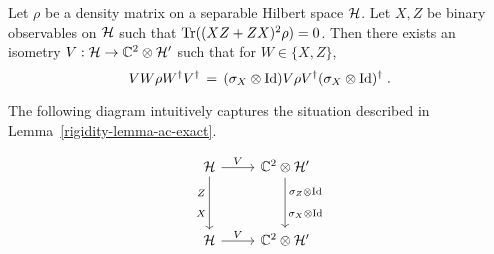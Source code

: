 \begin{lemma}\label{lemma-ac-exact}
Let $\rho$ be a density matrix on a separable Hilbert space $\mathcal{H}$. Let $X,Z$ be binary observables on $\mathcal{H}$ such that $\mathrm{Tr}( (XZ+ZX)^2 \rho)=0$. Then there exists an isometry $V: \mathcal{H} \to \mathbb{C}^2 \otimes \mathcal{H}'$ such that for $W\in\{X,Z\}$,
\[ VW\rho W^\dagger V^\dagger \,=\, (\sigma_X \otimes \mathop{\rm Id}\nolimits)V\rho V^\dagger (\sigma_X \otimes \mathop{\rm Id}\nolimits)^\dagger\;.\]
\end{lemma}

The following diagram intuitively captures the situation described in Lemma~\ref{rigidity-lemma-ac-exact}. 

\begin{equation}
\label{diagram-one-qubit-b}
\begin{tikzcd}
\mH  \arrow{r}{V}  \arrow[swap]{dd}{\substack{Z \\[3mm] X}} &  \C^2 \otimes \mH' \arrow{dd}{\substack{\sigma_Z\otimes \Id\\[3mm] \sigma_X\otimes \Id}} \\
&\\ 
\mH  \arrow{r}{V} & \C^2 \otimes \mH'
\end{tikzcd}
\end{equation}

